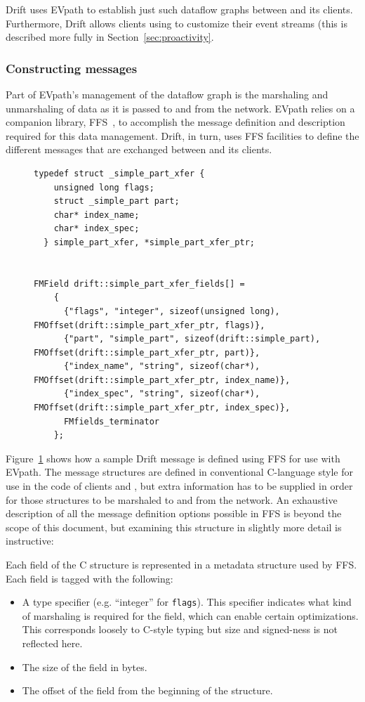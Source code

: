 Drift uses EVpath to establish just such dataflow graphs between \driftd and its clients.  Furthermore,
Drift allows clients using \libdrift to customize their event streams (this is described more fully in
Section~\ref{sec:proactivity}. 

\subsubsection{Constructing messages}

Part of EVpath's management of the dataflow graph is the marshaling and unmarshaling of data as it is
passed to and from the network.  EVpath relies on a companion library, FFS~\cite{eisenhauer11:FFS}, to
accomplish the message definition and description required for this data management.  Drift, in turn,
uses FFS facilities to define the different messages that are exchanged between \driftd and its clients.

\begin{figure}
\begin{lstlisting}
typedef struct _simple_part_xfer {
    unsigned long flags;
    struct _simple_part part;
    char* index_name;
    char* index_spec;
  } simple_part_xfer, *simple_part_xfer_ptr;


FMField drift::simple_part_xfer_fields[] =
    {
      {"flags", "integer", sizeof(unsigned long), FMOffset(drift::simple_part_xfer_ptr, flags)},
      {"part", "simple_part", sizeof(drift::simple_part), FMOffset(drift::simple_part_xfer_ptr, part)},
      {"index_name", "string", sizeof(char*), FMOffset(drift::simple_part_xfer_ptr, index_name)},
      {"index_spec", "string", sizeof(char*), FMOffset(drift::simple_part_xfer_ptr, index_spec)},
      FMfields_terminator
    };
\end{lstlisting}
\label{fig:field-list}
\end{figure}

Figure~\ref{fig:field-list} shows how a sample Drift message is defined using FFS for use with EVpath.
The message structures are defined in conventional C-language style for use in the code of clients and
\driftd, but extra information has to be supplied in order for those structures to be marshaled to and
from the network.  An exhaustive description of all the message definition options possible in FFS is
beyond the scope of this document, but examining this structure in slightly more detail is instructive:

Each field of the C structure is represented in a metadata structure used by FFS.  Each field is tagged
with the following:
\begin{itemize}
\item A type specifier (e.g. ``integer'' for \texttt{flags}).  This specifier indicates what kind of
  marshaling is required for the field, which can enable certain optimizations.  This corresponds loosely
  to C-style typing but size and signed-ness is not reflected here.
\item The size of the field in bytes.
\item The offset of the field from the beginning of the structure.
\end{itemize}

